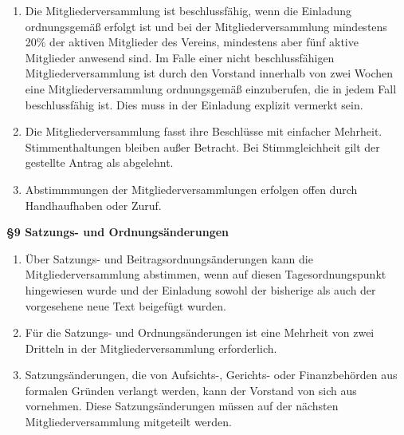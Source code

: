 \documentclass[a4paper,
               12pt,
               titlepage,
               parskip=half]{scrartcl}
\begin{document}
{\begin{enumerate}
		\item Die Mitgliederversammlung ist beschlussfähig, wenn die Einladung ordnungsgemäß erfolgt ist und bei der Mitgliederversammlung mindestens 20\% der aktiven Mitglieder des Vereins, mindestens aber fünf aktive Mitglieder anwesend sind. Im Falle einer nicht beschlussfähigen Mitgliederversammlung ist durch den Vorstand innerhalb von zwei Wochen eine Mitgliederversammlung ordnungsgemäß einzuberufen, die in jedem Fall beschlussfähig ist. Dies muss in der Einladung explizit vermerkt sein.
		\item Die Mitgliederversammlung fasst ihre Beschlüsse mit einfacher Mehrheit. Stimmenthaltungen bleiben außer Betracht. Bei Stimmgleichheit gilt der gestellte Antrag als abgelehnt.
		\item Abstimmmungen der Mitgliederversammlungen erfolgen offen durch Handhaufhaben oder Zuruf.
	\end{enumerate}
}

\vspace{1.0em}

\textbf{§9 Satzungs- und Ordnungsänderungen}
{\small
	\begin{enumerate}
		\item Über Satzungs- und Beitragsordnungsänderungen kann die Mitgliederversammlung abstimmen, wenn auf diesen Tagesordnungspunkt hingewiesen wurde und der Einladung sowohl der bisherige als auch der vorgesehene neue Text beigefügt wurden.
		\item Für die Satzungs- und Ordnungsänderungen ist eine Mehrheit von zwei Dritteln in der Mitgliederversammlung erforderlich.
		\item Satzungsänderungen, die von Aufsichts-, Gerichts- oder Finanzbehörden aus formalen Gründen verlangt werden, kann der Vorstand von sich aus vornehmen. Diese Satzungsänderungen müssen auf der nächsten Mitgliederversammlung mitgeteilt werden.
	\end{enumerate}
}

\vspace{1.0em}
\end{document}
